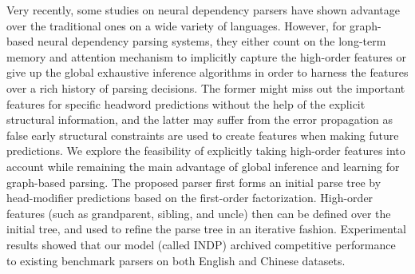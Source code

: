 Very recently, some studies on neural dependency parsers have shown advantage over the traditional ones on a wide variety of languages. However, for graph-based neural dependency parsing systems, they either count on the long-term memory and attention mechanism to implicitly capture the high-order features or give up the global exhaustive inference algorithms in order to harness the features over a rich history of parsing decisions. The former might miss out the important features for specific headword predictions without the help of the explicit structural information, and the latter may suffer from the error propagation as false early structural constraints are used to create features when making future predictions. We explore the feasibility of explicitly taking high-order features into account while remaining the main advantage of global inference and learning for graph-based parsing. The proposed parser first forms an initial parse tree by head-modifier predictions based on the first-order factorization. High-order features (such as grandparent, sibling, and uncle) then can be defined over the initial tree, and used to refine the parse tree in an iterative fashion. Experimental results showed that our model (called INDP) archived competitive performance to existing benchmark parsers on both English and Chinese datasets.
